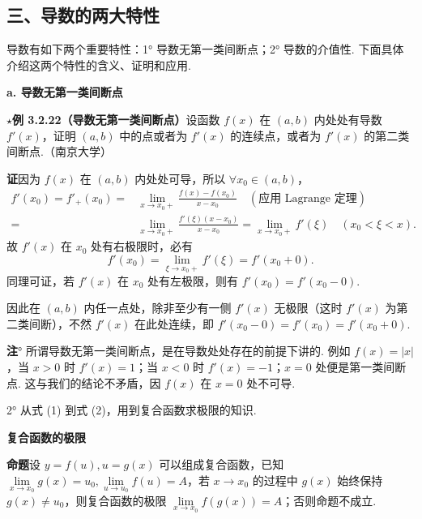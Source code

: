 \documentclass[UTF8,12pt,a4paper,fontset=fandol]{ctexart}
\begin{document}
\subsection*{三、导数的两大特性}

导数有如下两个重要特性：1° 导数无第一类间断点；2° 导数的介值性. 下面具体介绍这两个特性的含义、证明和应用.

\noindent\textbf{a. 导数无第一类间断点}

\noindent\textbf{$\star$例 3.2.22（导数无第一类间断点）}\quad 设函数 $f(x)$ 在 $(a,b)$ 内处处有导数 $f'(x)$，证明 $(a,b)$ 中的点或者为 $f'(x)$ 的连续点，或者为 $f'(x)$ 的第二类间断点.（南京大学）

\noindent\textbf{证}\quad 因为 $f(x)$ 在 $(a,b)$ 内处处可导，所以 $\forall x_0\in(a,b)$，
\begin{equation}
\begin{aligned}
f'(x_0)=f'_+(x_0)
={}&\lim_{x\to x_0+}\frac{f(x)-f(x_0)}{x-x_0}\quad(\text{应用 Lagrange 定理})\\
={}&\lim_{x\to x_0+}\frac{f'(\xi)(x-x_0)}{x-x_0}
=\lim_{x\to x_0+}f'(\xi)\quad(x_0<\xi<x).
\end{aligned}
\tag{1}
\end{equation}
故 $f'(x)$ 在 $x_0$ 处有右极限时，必有
\begin{equation}
  f'(x_0)=\lim_{\xi\to x_0+}f'(\xi)=f'(x_0+0).
\tag{2}
\end{equation}
同理可证，若 $f'(x)$ 在 $x_0$ 处有左极限，则有 $f'(x_0)=f'(x_0-0)$.

因此在 $(a,b)$ 内任一点处，除非至少有一侧 $f'(x)$ 无极限（这时 $f'(x)$ 为第二类间断），不然 $f'(x)$ 在此处连续，即 $f'(x_0-0)=f'(x_0)=f'(x_0+0)$.

\noindent\textbf{注}° 所谓导数无第一类间断点，是在导数处处存在的前提下讲的. 例如 $f(x)=|x|$，当 $x>0$ 时 $f'(x)=1$；当 $x<0$ 时 $f'(x)=-1$；$x=0$ 处便是第一类间断点. 这与我们的结论不矛盾，因 $f(x)$ 在 $x=0$ 处不可导.

2° 从式 (1) 到式 (2)，用到复合函数求极限的知识.

\noindent\textbf{复合函数的极限}

\noindent\textbf{命题}\quad 设 $y=f(u),u=g(x)$ 可以组成复合函数，已知 $\lim\limits_{x\to x_0}g(x)=u_0,\lim\limits_{u\to u_0}f(u)=A$，若 $x\to x_0$ 的过程中 $g(x)$ 始终保持 $g(x)\ne u_0$，则复合函数的极限 $\lim\limits_{x\to x_0}f(g(x))=A$；否则命题不成立.
\end{document}
